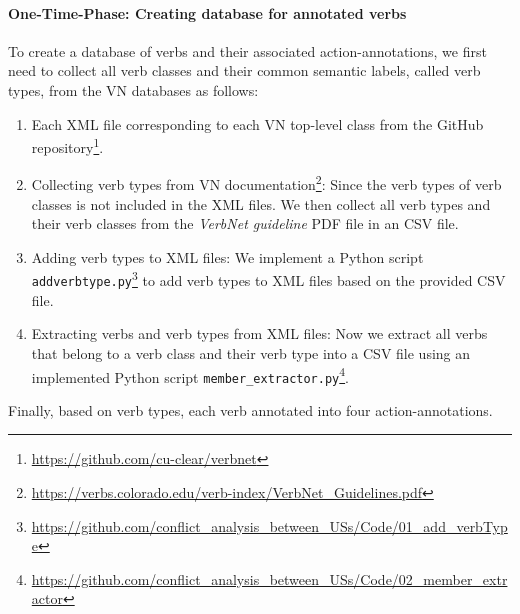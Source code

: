 \paragraph{One-Time-Phase: Creating database for annotated verbs}To create a database of verbs and their associated action-annotations, we first need to collect all verb classes and their common semantic labels, called verb types, from the VN databases as follows:
\begin{enumerate}
	\item Each XML file corresponding to each VN top-level class from the GitHub repository\footnote{\href{https://github.com/cu-clear/verbnet}{https://github.com/cu-clear/verbnet}}.
	
	\item Collecting verb types from VN documentation\footnote{\href{https://verbs.colorado.edu/verb-index/VerbNet_Guidelines.pdf}{https://verbs.colorado.edu/verb-index/VerbNet\_Guidelines.pdf}}: Since the verb types of verb classes is not included in the XML files. We then collect all verb types and their verb classes from the \textit{VerbNet guideline} PDF file in an CSV file.
	
	\item Adding verb types to XML files: We implement a Python script \texttt{addverbtype.py}\footnote{\href{https://github.com/amirrabieyannejad/conflict_analysis_between_USs/tree/main/Code/VN_Verb_Categorisation/01_add_verbType}{https://github.com/conflict\_analysis\_between\_USs/Code/01\_add\_verbType}} to add verb types to XML files based on the provided CSV file.
	
	\item Extracting verbs and verb types from XML files: Now we extract all verbs that belong to a verb class and their verb type into a CSV file using an implemented Python script \texttt{member\_extractor.py}\footnote{\href{https://github.com/amirrabieyannejad/conflict_analysis_between_USs/tree/main/Code/VN_Verb_Categorisation/02_member_extractor}{https://github.com/conflict\_analysis\_between\_USs/Code/02\_member\_extractor}}.
\end{enumerate}
Finally, based on verb types, each verb annotated into four action-annotations. 

